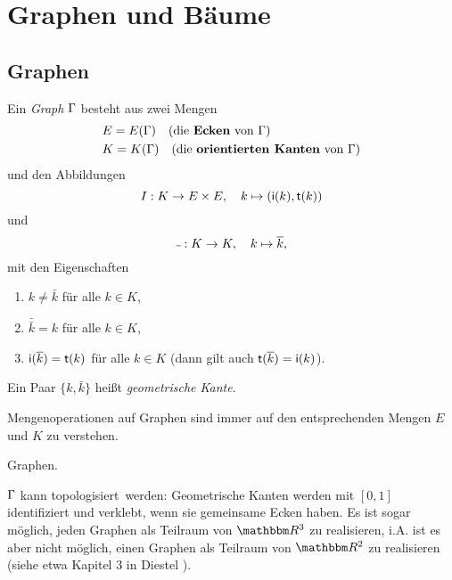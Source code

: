 \chapter{Graphen und Bäume}

\section{Graphen}\label{sec_graphen}

\DEF Ein \emph{Graph} $\Gamma$ besteht aus zwei Mengen
\begin{align*}
& E=E(\GR) \quad \text{(die \emph{Ecken}\index{Ecke} von $\GR$)} \\
& K=K(\GR) \quad \text{(die \emph{orientierten Kanten}\index{Kante}\index{orientierte Kanten}\index{Kante!orientiert} von $\GR$)}
\end{align*}
und den Abbildungen
\[
I : K \rightarrow E\times E,\quad k \mapsto (\mathsf{i}(k),\mathsf{t}(k))
\]
und
\[
\bar{\ }:K\Ra K,\quad k\mapsto\bar{k},
\]
mit den Eigenschaften
\begin{enumerate}
\item $k\neq \bar{k}$ für alle $k\in K$,
\item $\bar{\bar{k}}=k$ für alle $k\in K$,
\item $\mathsf{i}(\overline{k})=\mathsf{t}(k)$ für alle $k\in K$ (dann gilt auch $\mathsf{t}(\overline{k})=\mathsf{i}(k)$).
\end{enumerate}
Ein Paar $\{k,\bar{k}\}$ heißt \emph{geometrische Kante}.

Mengenoperationen auf Graphen sind immer auf den entsprechenden
Mengen $E$ und $K$ zu verstehen.

\BSP Graphen.
\begin{center}
\end{center}

\BEM $\Gamma$ kann \glqq topologisiert\grqq\ werden:
Geometrische Kanten werden mit $[0,1]$ identifiziert und verklebt,
wenn sie gemeinsame Ecken haben. Es ist sogar möglich, jeden
Graphen als Teilraum von $\RR^3$ zu realisieren, i.A. ist es aber nicht möglich, einen Graphen als Teilraum von $\RR^2$ zu realisieren
(siehe etwa Kapitel 3 in Diestel \cite{diestel}).

